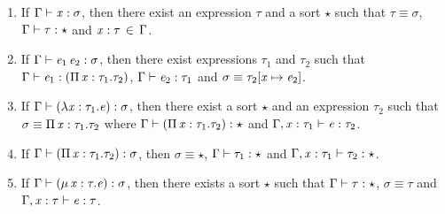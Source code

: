 \begin{lem}\label{lem:gen}
$\quad$
\begin{enumerate}[(1)]
	\item If $\Gamma  \vdash  \mathit{x}  :  \sigma$, then there exist an expression $\tau$ and a sort $\star$ such that $\tau  \equiv  \sigma$, $\Gamma  \vdash  \tau  :  \star$ and $\mathit{x}  :  \tau \, \in \, \Gamma$.
	\item If $\Gamma  \vdash  \mathit{e_{{\mathrm{1}}}} \, \mathit{e_{{\mathrm{2}}}}  :  \sigma$, then there exist expressions $\tau_{{\mathrm{1}}}$ and $\tau_{{\mathrm{2}}}$ such that $\Gamma  \vdash  \mathit{e_{{\mathrm{1}}}}  :  (  \Pi \, \mathit{x}  :  \tau_{{\mathrm{1}}}  .  \tau_{{\mathrm{2}}}  )$, $\Gamma  \vdash  \mathit{e_{{\mathrm{2}}}}  :  \tau_{{\mathrm{1}}}$ and $\sigma  \equiv  \tau_{{\mathrm{2}}}  [  \mathit{x}  \mapsto  \mathit{e_{{\mathrm{2}}}}  ]$.
	\item If $\Gamma  \vdash  (  \lambda  \mathit{x}  :  \tau_{{\mathrm{1}}}  .  \mathit{e}  )  :  \sigma$, then there exist a sort $\star$ and an expression $\tau_{{\mathrm{2}}}$ such that $\sigma  \equiv  \Pi \, \mathit{x}  :  \tau_{{\mathrm{1}}}  .  \tau_{{\mathrm{2}}}$ where $\Gamma  \vdash  (  \Pi \, \mathit{x}  :  \tau_{{\mathrm{1}}}  .  \tau_{{\mathrm{2}}}  )  :  \star$ and $\Gamma  ,  \mathit{x}  :  \tau_{{\mathrm{1}}}  \vdash  \mathit{e}  :  \tau_{{\mathrm{2}}}$.
    \item If $\Gamma  \vdash  (  \Pi \, \mathit{x}  :  \tau_{{\mathrm{1}}}  .  \tau_{{\mathrm{2}}}  )  :  \sigma$, then $\sigma  \equiv  \star$, $\Gamma  \vdash  \tau_{{\mathrm{1}}}  :  \star$ and $\Gamma  ,  \mathit{x}  :  \tau_{{\mathrm{1}}}  \vdash  \tau_{{\mathrm{2}}}  :  \star$.
	\item If $\Gamma  \vdash  (  \mu \, \mathit{x}  :  \tau  .  \mathit{e}  )  :  \sigma$, then there exists a sort $\star$ such that $\Gamma  \vdash  \tau  :  \star$, $\sigma  \equiv  \tau$ and $\Gamma  ,  \mathit{x}  :  \tau  \vdash  \mathit{e}  :  \tau$.

\end{enumerate}
\end{lem}
